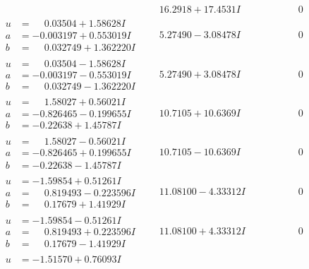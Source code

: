 \documentclass[1p]{elsarticle_modified}
\theoremstyle{definition}
\begin{document}
$$\begin{array}{c|c|c}
 & \phantom{-}16.2918 + 17.4531 I & \phantom{-0.000000 } 0 \\ \hline\begin{aligned}
u &= \phantom{-}0.03504 + 1.58628 I \\
a &= -0.003197 + 0.553019 I \\
b &= \phantom{-}0.032749 + 1.362220 I\end{aligned}
 & \phantom{-}5.27490 - 3.08478 I & \phantom{-0.000000 } 0 \\ \hline\begin{aligned}
u &= \phantom{-}0.03504 - 1.58628 I \\
a &= -0.003197 - 0.553019 I \\
b &= \phantom{-}0.032749 - 1.362220 I\end{aligned}
 & \phantom{-}5.27490 + 3.08478 I & \phantom{-0.000000 } 0 \\ \hline\begin{aligned}
u &= \phantom{-}1.58027 + 0.56021 I \\
a &= -0.826465 - 0.199655 I \\
b &= -0.22638 + 1.45787 I\end{aligned}
 & \phantom{-}10.7105 + 10.6369 I & \phantom{-0.000000 } 0 \\ \hline\begin{aligned}
u &= \phantom{-}1.58027 - 0.56021 I \\
a &= -0.826465 + 0.199655 I \\
b &= -0.22638 - 1.45787 I\end{aligned}
 & \phantom{-}10.7105 - 10.6369 I & \phantom{-0.000000 } 0 \\ \hline\begin{aligned}
u &= -1.59854 + 0.51261 I \\
a &= \phantom{-}0.819493 - 0.223596 I \\
b &= \phantom{-}0.17679 + 1.41929 I\end{aligned}
 & \phantom{-}11.08100 - 4.33312 I & \phantom{-0.000000 } 0 \\ \hline\begin{aligned}
u &= -1.59854 - 0.51261 I \\
a &= \phantom{-}0.819493 + 0.223596 I \\
b &= \phantom{-}0.17679 - 1.41929 I\end{aligned}
 & \phantom{-}11.08100 + 4.33312 I & \phantom{-0.000000 } 0 \\ \hline\begin{aligned}
u &= -1.51570 + 0.76093 I \\

\end{aligned}
\end{array}$$
\end{document}
